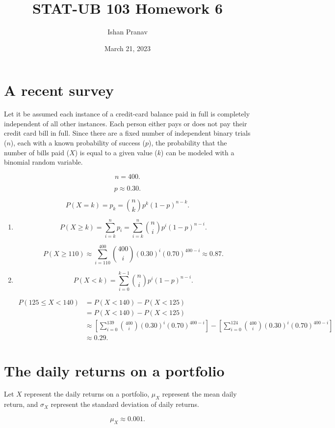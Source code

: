 \documentclass[12pt]{article}
\title{STAT-UB 103 Homework 6}
\author{Ishan Pranav}
\date{March 21, 2023}
\begin{document}
\maketitle
\section{A recent survey}
Let it be assumed each instance of a credit-card balance paid in full is completely independent of all other instances. Each person either pays or does not pay their credit card bill in full. Since there are a fixed number of independent binary trials ($n$), each with a known probability of success ($p$), the probability that the number of bills paid ($X$) is equal to a given value ($k$) can be modeled with a binomial random variable.

\[n=400.\]

\[p\approx 0.30.\]

\[P(X=k)=p_k={\binom{n}{k}}p^k(1-p)^{n-k}.\]

\begin{enumerate}
\item\[P(X\geq k)=\sum^{n}_{i=k}{p_i}=\sum^{n}_{i=k}{{\binom{n}{i}}p^i(1-p)^{n-i}}.\]

\[P(X\geq 110)\approx\sum^{400}_{i=110}{{\binom{400}{i}}(0.30)^i(0.70)^{400-i}}\approx 0.87.\]

\item\[P(X<k)=\sum^{k-1}_{i=0}{\binom{n}{i}p^i(1-p)^{n-i}}.\]

\begin{align*}
P(125\leq X<140)
&=P(X<140)-P(X<125)\\
&=P(X<140)-P(X<125)\\
&\approx\left[\sum^{139}_{i=0}{\binom{400}{i}(0.30)^i(0.70)^{400-i}}\right]-\left[\sum^{124}_{i=0}{\binom{400}{i}(0.30)^i(0.70)^{400-i}}\right]\\
&\approx 0.29.
\end{align*}
\end{enumerate}
\section{The daily returns on a portfolio}
Let $X$ represent the daily returns on a portfolio, $\mu_X$ represent the mean daily return, and $\sigma_X$ represent the standard deviation of daily returns.

\[\mu_X\approx 0.001.\]
\end{document}
